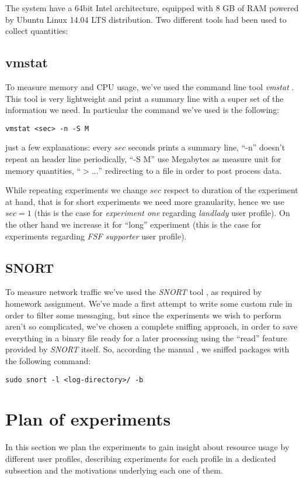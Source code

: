 \documentclass[10pt,a4paper]{article}
\begin{document}
    The system have a 64bit Intel architecture, equipped with 8 GB of
    RAM powered by Ubuntu Linux 14.04 LTS distribution. Two different
    tools had been used to collect quantities:

    \subsection{vmstat} 
    To measure memory and CPU usage, we've used the command line tool
    \emph{vmstat} \cite{vmstat}. This tool is very lightweight and
    print a summary line with a super set of the information we
    need. In particular the command we've used is the following:
\begin{verbatim}
vmstat <sec> -n -S M 
\end{verbatim}
    just a few explanations: every $sec$ seconds prints a summary line,
    ``-n'' doesn't repeat an header line periodically, ``-S M'' use
    Megabytes as measure unit for memory quantities, ``$> ...$''
    redirecting to a file in order to post process data. 

    While repeating experiments we change $sec$ respect to duration of
    the experiment at hand, that is for short experiments we need more
    granularity, hence we use $sec = 1$ (this is the case for
    \emph{experiment one} regarding \emph{landlady} user profile). On
    the other hand we increase it for ``long'' experiment (this is the
    case for experiments regarding \emph{FSF supporter} user profile).

    \subsection{SNORT} 
    To measure network traffic we've used the \emph{SNORT} tool
    \cite{SNORT}, as required by homework assignment. We've made a
    first attempt to write some custom rule in order to filter some
    messaging, but since the experiments we wish to perform aren't so
    complicated, we've chosen a complete sniffing approach, in order
    to save everything in a binary file ready for a later processing
    using the ``read'' feature provided by \emph{SNORT} itself. So,
    according the manual \cite{SNORT-manual}, we sniffed packages with
    the following command:
\begin{verbatim}
sudo snort -l <log-directory>/ -b
\end{verbatim}


    \newpage
    \section{Plan of experiments}
    \label{sec:plan-of-experiment}
    In this section we plan the experiments to gain insight about
    resource usage by different user profiles, describing experiments
    for each profile in a dedicated subsection and the motivations
    underlying each one of them.
\end{document}
